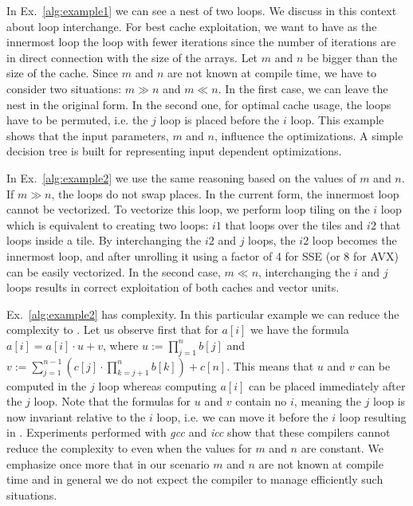 \setcounter{algorithm}{1}

In Ex.~\ref{alg:example1} we can see a nest of two loops. We discuss in this context about loop interchange. For best cache exploitation, we want to have as the innermost loop the loop with fewer iterations since the number of iterations are in direct connection with the size of the arrays. Let $m$ and $n$ be bigger than the size of the cache. Since $m$ and $n$ are not known at compile time, we have to consider two situations: $m \gg n$ and $m \ll n$. In the first case, we can leave the nest in the original form. In the second one, for optimal cache usage, the loops have to be permuted, i.e. the $j$ loop is placed before the $i$ loop. This example shows that the input parameters, $m$ and $n$, influence the optimizations. A simple decision tree is built for representing input dependent optimizations. 

In Ex.~\ref{alg:example2} we use the same reasoning based on the values of $m$ and $n$. If $m \gg n$, the loops do not swap places. In the current form, the innermost loop cannot be vectorized. To vectorize this loop, we perform loop tiling on the $i$ loop which is equivalent to creating two loops: $\textit{i1}$ that loops over the tiles and $\textit{i2}$ that loops inside a tile. By interchanging the $\textit{i2}$ and $j$ loops, the $\textit{i2}$ loop becomes the innermost loop, and after unrolling it using a factor of 4 for SSE (or 8 for AVX) can be easily vectorized. In the second case,  $m \ll n$, interchanging the $i$ and $j$ loops results in correct exploitation of both caches and vector units. 

Ex.~\ref{alg:example2} has  complexity. In this particular example we can reduce the complexity to . Let us observe first that for $a[i]$ we have the formula $a[i] = a[i] \cdot u + v$, where $u := \prod_{j=1}^n b[j]$ and $v := \sum_{j=1}^{n-1} ( c[j] \cdot \prod_{k=j+1}^n b[k]) + c[n]$. This means that $u$ and $v$ can be computed in the $j$ loop whereas computing $a[i]$ can be placed immediately after the $j$ loop. Note that the formulas for $u$ and $v$ contain no $i$, meaning the $j$ loop is now invariant relative to the $i$ loop, i.e. we can move it before the $i$ loop resulting in . Experiments performed with \textit{gcc} and \textit{icc} show that these compilers cannot reduce the complexity to  even when the values for $m$ and $n$ are constant. We emphasize once more that in our scenario $m$ and $n$ are not known at compile time and in general we do not expect the compiler to manage efficiently such situations.

